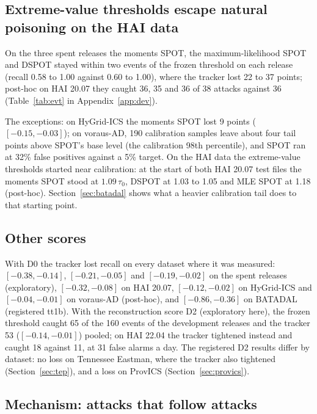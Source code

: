 \documentclass[letterpaper,twocolumn,10pt]{article}
\begin{document}
\subsection{Extreme-value thresholds escape natural poisoning on the HAI data}
\label{sec:evt}

On the three spent releases the moments SPOT, the maximum-likelihood SPOT and DSPOT stayed within two
events of the frozen threshold on each release (recall 0.58 to 1.00 against 0.60 to 1.00), where the tracker lost 22 to 37 points; post-hoc
on HAI 20.07 they caught 36, 35 and 36 of 38 attacks against 36 (Table~\ref{tab:evt} in
Appendix~\ref{app:dev}).

The exceptions: on HyGrid-ICS the moments SPOT lost 9 points ($[-0.15, -0.03]$); on voraus-AD, 190
calibration samples leave about four tail points above SPOT's base level (the calibration 98th
percentile), and SPOT ran at 32\% false positives against a 5\% target. On the HAI data the
extreme-value thresholds started near calibration: at the start of both HAI 20.07 test files the
moments SPOT stood at $1.09\,\tau_0$, DSPOT at 1.03 to 1.05 and MLE SPOT at 1.18 (post-hoc).
Section~\ref{sec:batadal} shows what a heavier calibration tail does to that starting point.

\subsection{Other scores}

With D0 the tracker lost recall on every dataset where it was measured: $[-0.38, -0.14]$,
$[-0.21, -0.05]$ and $[-0.19, -0.02]$ on the spent releases (exploratory), $[-0.32, -0.08]$ on HAI
20.07, $[-0.12, -0.02]$ on HyGrid-ICS and $[-0.04, -0.01]$ on voraus-AD (post-hoc), and
$[-0.86, -0.36]$ on BATADAL (registered tt1b). With the reconstruction score D2
(exploratory here), the frozen threshold caught 65 of the 160 events of the development releases and
the tracker 53 ($[-0.14, -0.01]$) pooled; on HAI 22.04 the tracker tightened instead and caught 18
against 11, at 31 false alarms a day. The registered D2 results differ by dataset: no loss on Tennessee
Eastman, where the tracker also tightened (Section~\ref{sec:tep}), and a loss on ProvICS
(Section~\ref{sec:provics}).

\subsection{Mechanism: attacks that follow attacks}
\end{document}
